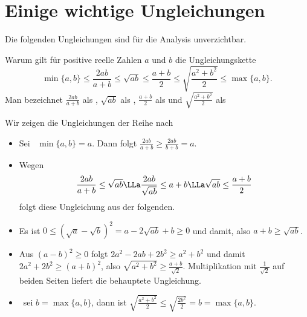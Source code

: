 \section{Einige wichtige Ungleichungen}

Die folgenden Ungleichungen sind für die Analysis unverzichtbar.


\begin{frage}\label{01_ungleichungen}
  
  Warum gilt für positive reelle Zahlen $a$ und $b$ die Ungleichungskette 
  \[
  \min \{ a,b \} \le \frac{2ab}{a+b} 
  \le \sqrt{ab} \le \frac{a+b}{2} 
  \le \sqrt{\frac{a^2+b^2}{2}}
  \le \max\{ a,b \}.
  \]
  Man bezeichnet 
  $\frac{2ab}{a+b}$ als , 
  $\sqrt{ab}$ als ,
  $\frac{a+b}{2}$ als  und 
  $\sqrt{\frac{a^2+b^2}{2}}$ als 
\end{frage}

\begin{antwort}
  Wir zeigen die Ungleichungen der Reihe nach
  {\setlength{\labelsep}{4mm}
    \begin{itemize}
    \item[\desc{1}] Sei \oBdA\ $\min \{ a,b \}=a$. Dann folgt 
      $\frac{2ab}{a+b} \ge \frac{2ab}{b+b} = a.$ \\[-2mm]
    \item[\desc{2}] Wegen 
      \[
      \frac{2ab}{a+b} \le \sqrt{ab} \LLa 
      \frac{2ab}{\sqrt{ab}} \le a+b \LLa 
      \sqrt{ab} \le \frac{a+b}{2} 
      \]
      folgt diese Ungleichung aus der folgenden.\\[-2mm] 
    \item[\desc{3}] Es ist 
      $0 \le \left(\sqrt{a} -\sqrt{b} \right)^2=a-2\sqrt{ab} +b \ge 0$ 
      und damit, also $a+b \ge \sqrt{ab}$. \\[-2mm] 
    \item[\desc{4}] Aus $(a-b)^2 \ge 0$ folgt 
      $2a^2-2ab +2b^2 \ge a^2+b^2$ und damit 
      $2a^2+2b^2 \ge(a+b)^2$, also 
      $\sqrt{a^2+b^2} \ge \frac{a+b}{\sqrt{2}}$. Multiplikation mit 
      $\frac{1}{\sqrt{2}}$ auf beiden Seiten liefert die behauptete 
      Ungleichung. \\[-2mm]
    \item[\desc{5}] \OBdA\ sei $b = \max \{ a,b \}$, dann ist 
      $\sqrt{\frac{a^2+b^2}{2}}\le \sqrt{ \frac{2b^2}{2} } = b = \max\{a,b\}$. 
      \AntEnd
    \end{itemize}}
\end{antwort}







